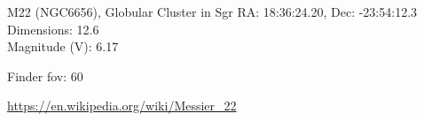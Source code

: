 \begin{block}{M22 (NGC6656), Globular Cluster in Sgr}
    RA: 18:36:24.20, Dec: -23:54:12.3 \\ 
    Dimensions: 12.6 \\ 
    Magnitude (V): 6.17



    Finder fov: 60 

    \url{https://en.wikipedia.org/wiki/Messier_22} 
\end{block}